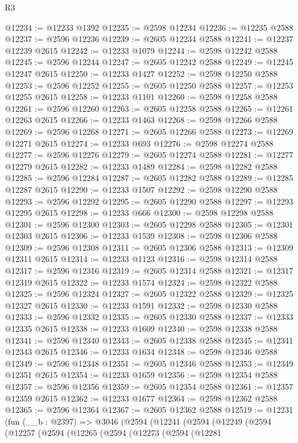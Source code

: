 \begin{lexlean}{R3}
\begin{coremodule}
@12234 := @12233 @1392
@12235 := @2598 @12234
@12236 := @12235 @2588
@12237 := @2596 @12236
@12239 := @2605 @12234 @2588
@12241 := @12237 @12239 @2615
@12242 := @12233 @1079
@12244 := @2598 @12242 @2588
@12245 := @2596 @12244
@12247 := @2605 @12242 @2588
@12249 := @12245 @12247 @2615
@12250 := @12233 @1427
@12252 := @2598 @12250 @2588
@12253 := @2596 @12252
@12255 := @2605 @12250 @2588
@12257 := @12253 @12255 @2615
@12258 := @12233 @1101
@12260 := @2598 @12258 @2588
@12261 := @2596 @12260
@12263 := @2605 @12258 @2588
@12265 := @12261 @12263 @2615
@12266 := @12233 @1463
@12268 := @2598 @12266 @2588
@12269 := @2596 @12268
@12271 := @2605 @12266 @2588
@12273 := @12269 @12271 @2615
@12274 := @12233 @693
@12276 := @2598 @12274 @2588
@12277 := @2596 @12276
@12279 := @2605 @12274 @2588
@12281 := @12277 @12279 @2615
@12282 := @12233 @1489
@12284 := @2598 @12282 @2588
@12285 := @2596 @12284
@12287 := @2605 @12282 @2588
@12289 := @12285 @12287 @2615
@12290 := @12233 @1507
@12292 := @2598 @12290 @2588
@12293 := @2596 @12292
@12295 := @2605 @12290 @2588
@12297 := @12293 @12295 @2615
@12298 := @12233 @666
@12300 := @2598 @12298 @2588
@12301 := @2596 @12300
@12303 := @2605 @12298 @2588
@12305 := @12301 @12303 @2615
@12306 := @12233 @1539
@12308 := @2598 @12306 @2588
@12309 := @2596 @12308
@12311 := @2605 @12306 @2588
@12313 := @12309 @12311 @2615
@12314 := @12233 @1123
@12316 := @2598 @12314 @2588
@12317 := @2596 @12316
@12319 := @2605 @12314 @2588
@12321 := @12317 @12319 @2615
@12322 := @12233 @1574
@12324 := @2598 @12322 @2588
@12325 := @2596 @12324
@12327 := @2605 @12322 @2588
@12329 := @12325 @12327 @2615
@12330 := @12233 @1591
@12332 := @2598 @12330 @2588
@12333 := @2596 @12332
@12335 := @2605 @12330 @2588
@12337 := @12333 @12335 @2615
@12338 := @12233 @1609
@12340 := @2598 @12338 @2588
@12341 := @2596 @12340
@12343 := @2605 @12338 @2588
@12345 := @12341 @12343 @2615
@12346 := @12233 @1634
@12348 := @2598 @12346 @2588
@12349 := @2596 @12348
@12351 := @2605 @12346 @2588
@12353 := @12349 @12351 @2615
@12354 := @12233 @1659
@12356 := @2598 @12354 @2588
@12357 := @2596 @12356
@12359 := @2605 @12354 @2588
@12361 := @12357 @12359 @2615
@12362 := @12233 @1677
@12364 := @2598 @12362 @2588
@12365 := @2596 @12364
@12367 := @2605 @12362 @2588
@12519 := @12231
    (fun (__b : @2397) =>
    @3046
      (@2594
        (@12241
          (@2594
            (@12249
              (@2594
                (@12257
                  (@2594
                    (@12265
                      (@2594
                        (@12273
                          (@2594
                            (@12281

\end{coremodule}
\end{lexlean}

